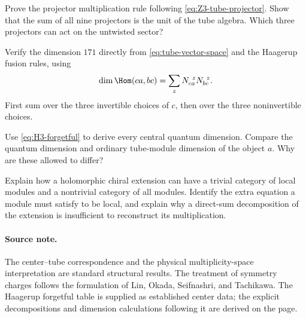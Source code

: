 \begin{exercise}\label{ex:Z3-tube}
Prove the projector multiplication rule following
\eqref{eq:Z3-tube-projector}.  Show that the sum of all nine
projectors is the unit of the tube algebra.  Which three projectors
can act on the untwisted sector?

\par\smallskip{}\par
\end{exercise}

\begin{exercise}\label{ex:tube171}
Verify the dimension $171$ directly from
\eqref{eq:tube-vector-space} and the Haagerup fusion rules, using
\[
 \dim\Hom(ca,bc)=\sum_z N_{ca}^{\ z}N_{bc}^{\ z}.
\]
First sum over the three invertible choices of $c$, then over the
three noninvertible choices.

\par\smallskip{}\par
\end{exercise}

\begin{exercise}\label{ex:forgetful-qdim}
Use \eqref{eq:H3-forgetful} to derive every central quantum
dimension.  Compare the quantum dimension and ordinary tube-module
dimension of the object $a$.  Why are these allowed to differ?

\par\smallskip{}\par
\end{exercise}

\begin{exercise}\label{ex:all-local}
Explain how a holomorphic chiral extension can have a trivial
category of local modules and a nontrivial category of all modules.
Identify the extra equation a module must satisfy to be local, and
explain why a direct-sum decomposition of the extension is
insufficient to reconstruct its multiplication.

\par\smallskip{}\par
\end{exercise}

\paragraph{Source note.}
The center--tube correspondence and the physical multiplicity-space
interpretation are standard structural results.  The treatment of
symmetry charges follows the formulation of Lin, Okada, Seifnashri,
and Tachikawa.  The Haagerup forgetful table is supplied as established
center data; the explicit decompositions and dimension calculations
following it are derived on the page.
